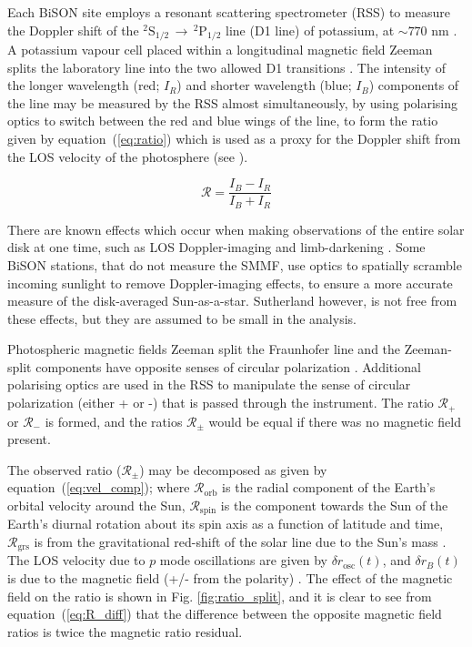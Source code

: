 Each  BiSON site employs a resonant scattering spectrometer (RSS) to measure the Doppler shift of the $^{2}\mathrm{S}_{1/2} \, \rightarrow \, ^{2}\mathrm{P}_{1/2}$ line (D1 line) of potassium, at $\sim 770$ nm \citep{brookes_resonant-scattering_1978}. A potassium vapour cell placed within a longitudinal magnetic field Zeeman splits the laboratory line into the two allowed D1 transitions \citep{lund_spatial_2017}. The intensity of the longer wavelength (red; $I_R$) and shorter wavelength (blue; $I_B$) components of the line may be measured by the RSS almost simultaneously, by using polarising optics to switch between the red and blue wings of the line, to form the ratio given by equation~(\ref{eq:ratio}) which is used as a proxy for the Doppler shift from the LOS velocity of the photosphere (see \citet{brookes_observation_1976, brookes_resonant-scattering_1978, elsworth_performance_1995, chaplin_studies_2003, lund_spatial_2017}).  

\begin{equation}
\mathcal{R} = \frac{I_B - I_R}{I_B + I_R}
\label{eq:ratio}
\end{equation}

There are known effects which occur when making observations of the entire solar disk at one time, such as LOS Doppler-imaging and limb-darkening \citep{davies_bison_2014}. Some BiSON stations, that do not measure the SMMF, use optics to spatially scramble incoming sunlight to remove Doppler-imaging effects, to ensure a more accurate measure of the disk-averaged Sun-as-a-star. Sutherland however, is not free from these effects, but they are assumed to be small in the analysis.

Photospheric magnetic fields Zeeman split the Fraunhofer line and the Zeeman-split components have opposite senses of circular polarization \citep{chaplin_studies_2003}. Additional polarising optics are used in the RSS to manipulate the sense of circular polarization (either + or -) that is passed through the instrument. The ratio $\mathcal{R}_{+}$ or $\mathcal{R}_{-}$ is formed, and the ratios $\mathcal{R}_{\pm}$ would be equal if there was no magnetic field present.

The observed ratio ($\mathcal{R}_{\pm}$) may be decomposed as given by equation~(\ref{eq:vel_comp}); where $\mathcal{R}_{\mathrm{orb}}$ is the radial component of the Earth's orbital velocity around the Sun, $\mathcal{R}_{\mathrm{spin}}$ is the component towards the Sun of the Earth's diurnal rotation about its spin axis as a function of latitude and time, $\mathcal{R}_{\mathrm{grs}}$ is from the gravitational red-shift of the solar line due to the Sun's mass \citep{elsworth_techniques_1995, dumbill_observation_1999}. The LOS velocity due to $p$ mode oscillations are given by $\delta {r}_{\mathrm{osc}}(t)$, and $\delta {r}_B(t)$ is due to the magnetic field (+/- from the polarity) \citep{dumbill_observation_1999}. The effect of the magnetic field on the ratio is shown in Fig. \ref{fig:ratio_split}, and it is clear to see from equation~(\ref{eq:R_diff}) that the difference between the opposite magnetic field ratios is twice the magnetic ratio residual.

